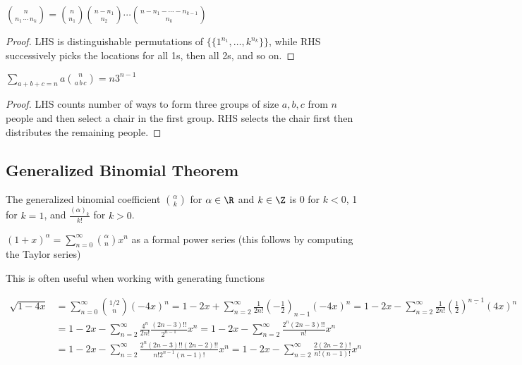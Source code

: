 \documentclass[a4paper]{article}
\begin{document}
\begin{theorem}
$\displaystyle \binom n{n_1\,\cdots\,n_k}=\binom n{n_1}\binom{n-n_1}{n_2}\cdots\binom{n-n_1-\cdots-n_{k-1}}{n_k}$

\begin{hl}
\begin{proof}
LHS is distinguishable permutations of $\{\{1^{n_1},\dots,k^{n_k}\}\}$, while RHS successively picks the locations for all 1s, then all 2s, and so on.
\end{proof}
\end{hl}
\end{theorem}

\begin{theorem}
$\displaystyle\sum_{a+b+c=n}a\binom n{a\,b\,c}=n3^{n-1}$

\begin{hl}
\begin{proof}
LHS counts number of ways to form three groups of size $a,b,c$ from $n$ people and then select a chair in the first group. RHS selects the chair first then distributes the remaining people.
\end{proof}
\end{hl}
\end{theorem}

\subsection{Generalized Binomial Theorem}

\begin{definition}
The generalized binomial coefficient $\binom\alpha k$ for $\alpha\in\R$ and $k\in\Z$ is 0 for $k<0$, 1 for $k=1$, and $\frac{(\alpha)_k}{k!}$ for $k>0$.
\end{definition}

\begin{theorem}
$(1+x)^\alpha=\sum_{n=0}^\infty\binom\alpha nx^n$ as a formal power series (this follows by computing the Taylor series)
\begin{arrows}
\item This is often useful when working with generating functions
\end{arrows}
\end{theorem}

\begin{example}\label{ex_sqrt_gen_bin}
\begin{align*}
\sqrt{1-4x}
&= \sum_{n=0}^\infty\binom{1/2}n(-4x)^n
= 1-2x+\sum_{n=2}^\infty\frac1{2n!}\left(-\frac12\right)_{n-1}(-4x)^n
= 1-2x-\sum_{n=2}^\infty\frac1{2n!}\left(\frac12\right)^{\underline{n-1}}(4x)^n\\
&= 1-2x-\sum_{n=2}^\infty\frac{4^n}{2n!}\frac{(2n-3)!!}{2^{n-1}}x^n
= 1-2x-\sum_{n=2}^\infty\frac{2^n(2n-3)!!}{n!}x^n\\
&= 1-2x-\sum_{n=2}^\infty\frac{2^n(2n-3)!!(2n-2)!!}{n!2^{n-1}(n-1)!}x^n
= 1-2x-\sum_{n=2}^\infty\frac{2(2n-2)!}{n!(n-1)!}x^n
\end{align*}
\end{example}
\end{document}
